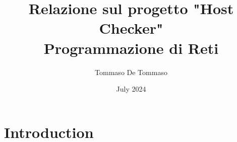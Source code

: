 \documentclass[a4paper,12pt]{report}
\title{Relazione sul progetto "Host Checker" \\ Programmazione di Reti}
\author{Tommaso De Tommaso}
\date{July 2024}
\begin{document}
\maketitle

\section{Introduction}
\end{document}
